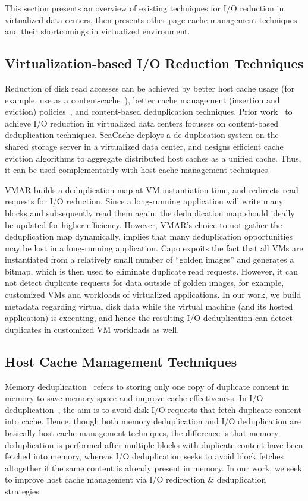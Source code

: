 
This section presents an overview
of existing techniques for I/O reduction in virtualized data centers,
then presents other page cache management techniques and their
shortcomings in virtualized environment.

\subsection{Virtualization-based I/O Reduction Techniques}
Reduction of disk read accesses can be achieved by 
better host cache usage (for example, use as a content-cache~\cite{iodedup}),
better cache management 
(insertion and eviction) policies~\cite{outperforming-LRU}, 
and content-based deduplication techniques.
Prior work~\cite{cooperative, VMAR, capo} to achieve I/O reduction in 
virtualized data centers focusses on content-based deduplication techniques.
SeaCache\cite{cooperative} deploys a de-duplication
system on the shared storage server in a virtualized data center, and
designs efficient cache eviction algorithms to aggregate distributed
host caches as a unified cache. Thus, it can be used
complementarily with host cache management techniques.

VMAR\cite{VMAR} builds a deduplication map at VM instantiation
time, and redirects read requests for I/O reduction.
Since a long-running application will write many blocks and subsequently
read them again, the deduplication map should ideally be updated for
higher efficiency. However, VMAR's choice to not gather the deduplication 
map dynamically, implies that many
deduplication opportunities may be lost in a long-running application.
Capo\cite{capo} expoits the fact that all VMs are instantiated
from a relatively small number of ``golden images'' and generates a bitmap,
which is then used to eliminate duplicate read requests. However, it
can not detect duplicate requests for data outside of golden images,
for example, customized VMs and workloads of
virtualized applications.
In our work, we build metadata regarding virtual disk data while
the virtual machine (and its hosted application) is executing, and hence
the resulting I/O deduplication can detect duplicates in customized
VM workloads as well.

\subsection{Host Cache Management Techniques}
Memory deduplication~\cite{satori, memorybuddies, difference-engine, singleton}
refers to storing only one copy of duplicate content in memory to 
save memory space and improve cache effectiveness. 
In I/O deduplication~\cite{iodedup}, the aim is to avoid disk I/O requests
that fetch duplicate content into cache. Hence, though both
memory deduplication and I/O deduplication are basically host cache
management techniques\cite{cooperative}, the difference is that
memory deduplication is performed after multiple blocks with duplicate
content have been fetched into memory, whereas I/O deduplication seeks to
avoid block fetches altogether if the same content is already present
in memory. In our work, we seek to improve host cache management via
I/O redirection \& deduplication strategies.

